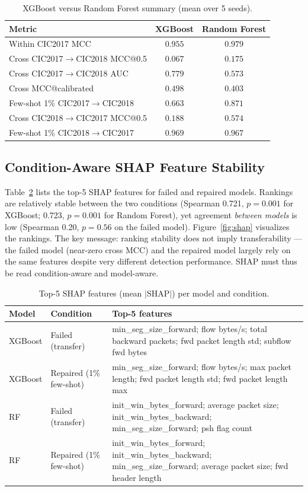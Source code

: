 \documentclass[11pt,a4paper]{article}
\begin{document}
\begin{table}[htbp]
\centering
\caption{XGBoost versus Random Forest summary (mean over 5 seeds).}
\label{tab:cmp}
\footnotesize
\begin{tabular}{lcc}
\toprule
Metric & XGBoost & Random Forest \\
\midrule
Within CIC2017 MCC                       & $0.955$ & $0.979$ \\
Cross CIC2017$\rightarrow$CIC2018 MCC@0.5 & $0.067$ & $0.175$ \\
Cross CIC2017$\rightarrow$CIC2018 AUC     & $0.779$ & $0.573$ \\
Cross MCC@calibrated                      & $0.498$ & $0.403$ \\
Few-shot 1\% CIC2017$\rightarrow$CIC2018  & $0.663$ & $0.871$ \\
Cross CIC2018$\rightarrow$CIC2017 MCC@0.5 & $0.188$ & $0.574$ \\
Few-shot 1\% CIC2018$\rightarrow$CIC2017  & $0.969$ & $0.967$ \\
\bottomrule
\end{tabular}
\end{table}

\subsection{Condition-Aware SHAP Feature Stability}
Table~\ref{tab:shap} lists the top-5 SHAP features for failed and repaired models.
Rankings are relatively stable between the two conditions (Spearman 0.721, $p=0.001$ for
XGBoost; 0.723, $p=0.001$ for Random Forest), yet agreement \emph{between models} is low
(Spearman 0.20, $p=0.56$ on the failed model). Figure~\ref{fig:shap} visualizes the
rankings. The key message: ranking stability does not imply transferability --- the failed
model (near-zero cross MCC) and the repaired model largely rely on the same features despite
very different detection performance. SHAP must thus be read condition-aware and
model-aware.

\begin{table}[htbp]
\centering
\caption{Top-5 SHAP features (mean $|$SHAP$|$) per model and condition.}
\label{tab:shap}
\footnotesize
\begin{tabular}{p{1.3cm}p{2.4cm}p{8.5cm}}
\toprule
Model & Condition & Top-5 features \\
\midrule
XGBoost & Failed (transfer) & min\_seg\_size\_forward; flow bytes/s; total backward packets; fwd packet length std; subflow fwd bytes \\
XGBoost & Repaired (1\% few-shot) & min\_seg\_size\_forward; flow bytes/s; max packet length; fwd packet length std; fwd packet length max \\
RF & Failed (transfer) & init\_win\_bytes\_forward; average packet size; init\_win\_bytes\_backward; min\_seg\_size\_forward; psh flag count \\
RF & Repaired (1\% few-shot) & init\_win\_bytes\_forward; init\_win\_bytes\_backward; min\_seg\_size\_forward; average packet size; fwd header length \\
\bottomrule
\end{tabular}
\end{table}
\end{document}
